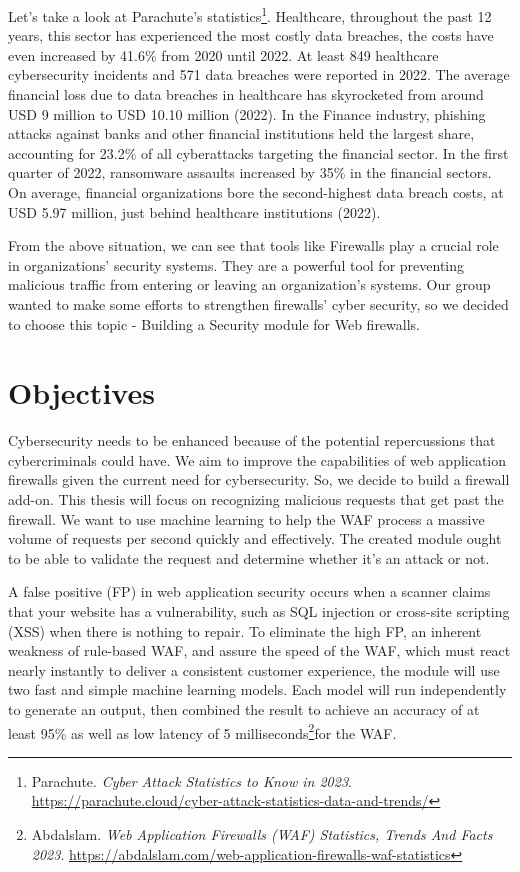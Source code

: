 Let's take a look at Parachute's statistics\footnote{Parachute. \textit{Cyber Attack Statistics to Know in 2023}. \url{https://parachute.cloud/cyber-attack-statistics-data-and-trends/}}. Healthcare, throughout the past 12 years, this sector has experienced the most costly data breaches, the costs have even increased by 41.6\% from 2020 until 2022. At least 849 healthcare cybersecurity incidents and 571 data breaches were reported in 2022. The average financial loss due to data breaches in healthcare has skyrocketed from around USD 9 million to USD 10.10 million (2022). In the Finance industry, phishing attacks against banks and other financial institutions held the largest share, accounting for 23.2\% of all cyberattacks targeting the financial sector. In the first quarter of 2022, ransomware assaults increased by 35\% in the financial sectors. On average, financial organizations bore the second-highest data breach costs, at USD 5.97 million, just behind healthcare institutions (2022). 

From the above situation, we can see that tools like Firewalls play a crucial role in organizations' security systems. They are a powerful tool for preventing malicious traffic from entering or leaving an organization’s systems. Our group wanted to make some efforts to strengthen firewalls' cyber security, so we decided to choose this topic - Building a Security module for Web firewalls.
\newpage
\section{Objectives}
\label{sec:objectives}
Cybersecurity needs to be enhanced because of the potential repercussions that cybercriminals could have. We aim to improve the capabilities of web application firewalls given the current need for cybersecurity. So, we decide to build a firewall add-on. This thesis will focus on recognizing malicious requests that get past the firewall. We want to use machine learning to help the WAF process a massive volume of requests per second quickly and effectively. The created module ought to be able to validate the request and determine whether it's an attack or not.

A false positive (FP) in web application security occurs when a scanner claims that your website has a vulnerability, such as SQL injection or cross-site scripting (XSS) when there is nothing to repair. To eliminate the high FP, an inherent weakness of rule-based WAF, and assure the speed of the WAF, which must react nearly instantly to deliver a consistent customer experience, the module will use two fast and simple machine learning models. Each model will run independently to generate an output, then combined the result to achieve an accuracy of at least 95\% as well as low latency of 5 milliseconds\footnote{Abdalslam. \textit{Web Application Firewalls (WAF) Statistics, Trends And Facts 2023}. 
\url{https://abdalslam.com/web-application-firewalls-waf-statistics}}for the WAF.

